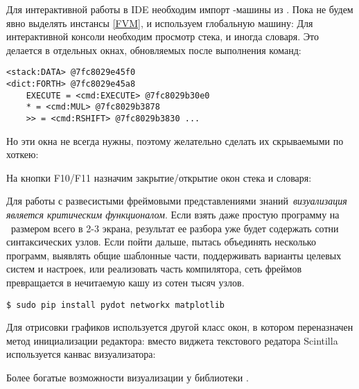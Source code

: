 \clearpage\noindent
Для интерактивной работы в IDE необходим импорт \F-машины из \metal.  
Пока не будем явно выделять инстансы  \ref{FVM}, и используем
глобальную машину:
\noindent
Для интерактивной консоли необходим просмотр стека, и иногда словаря. Это
делается в отдельных окнах, обновляемых после выполнения команд:
\begin{verbatim}
<stack:DATA> @7fc8029e45f0
<dict:FORTH> @7fc8029e45a8
    EXECUTE = <cmd:EXECUTE> @7fc8029b30e0
    * = <cmd:MUL> @7fc8029b3878
    >> = <cmd:RSHIFT> @7fc8029b3830 ...
\end{verbatim}

Но эти окна не всегда нужны, поэтому желательно сделать их скрываемыми по
хоткею:

\noindent
На кнопки F10/F11 назначим закрытие/открытие окон стека и словаря:


\clearpage
{}

Для работы с развесистыми фреймовыми представлениями знаний\ \emph{визуализация является
критическим функционалом}. Если взять даже простую программу на \emc\ размером
всего в 2-3 экрана, результат ее разбора уже будет содержать сотни
синтаксических узлов. Если пойти дальше, пытась объединять несколько программ,
выявлять общие шаблонные части, поддерживать варианты целевых систем и настроек,
или реализовать часть компилятора, сеть фреймов превращается в нечитаемую кашу
из сотен тысяч узлов.

\begin{verbatim}
$ sudo pip install pydot networkx matplotlib
\end{verbatim}

Для отрисовки графиков используется другой класс окон, в котором переназначен
метод инициализации редактора: вместо виджета текстового редатора Scintilla
используется канвас визуализатора:

{}

Более богатые возможности визуализации у библиотеки .


\secup

\secup
